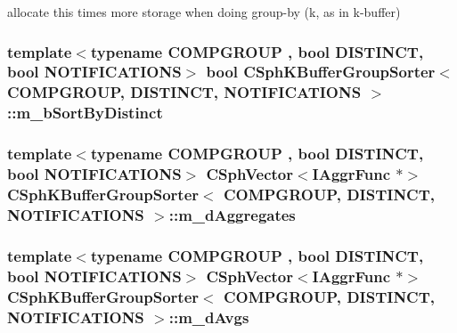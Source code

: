 allocate this times more storage when doing group-\/by (k, as in k-\/buffer) 

\hypertarget{classCSphKBufferGroupSorter_a27567c54ff3ffd4c83daebf4bb09470b}{
\subsubsection[{m\-\_\-b\-Sort\-By\-Distinct}]{\setlength{\rightskip}{0pt plus 5cm}template$<$typename C\-O\-M\-P\-G\-R\-O\-U\-P , bool D\-I\-S\-T\-I\-N\-C\-T, bool N\-O\-T\-I\-F\-I\-C\-A\-T\-I\-O\-N\-S$>$ bool {\bf C\-Sph\-K\-Buffer\-Group\-Sorter}$<$ C\-O\-M\-P\-G\-R\-O\-U\-P, D\-I\-S\-T\-I\-N\-C\-T, N\-O\-T\-I\-F\-I\-C\-A\-T\-I\-O\-N\-S $>$\-::m\-\_\-b\-Sort\-By\-Distinct\hspace{0.3cm}{\ttfamily [protected]}}}\label{classCSphKBufferGroupSorter_a27567c54ff3ffd4c83daebf4bb09470b}
\hypertarget{classCSphKBufferGroupSorter_ad0892c9b2b931104399b2c0136016fa8}{
\subsubsection[{m\-\_\-d\-Aggregates}]{\setlength{\rightskip}{0pt plus 5cm}template$<$typename C\-O\-M\-P\-G\-R\-O\-U\-P , bool D\-I\-S\-T\-I\-N\-C\-T, bool N\-O\-T\-I\-F\-I\-C\-A\-T\-I\-O\-N\-S$>$ {\bf C\-Sph\-Vector}$<${\bf I\-Aggr\-Func} $\ast$$>$ {\bf C\-Sph\-K\-Buffer\-Group\-Sorter}$<$ C\-O\-M\-P\-G\-R\-O\-U\-P, D\-I\-S\-T\-I\-N\-C\-T, N\-O\-T\-I\-F\-I\-C\-A\-T\-I\-O\-N\-S $>$\-::m\-\_\-d\-Aggregates\hspace{0.3cm}{\ttfamily [protected]}}}\label{classCSphKBufferGroupSorter_ad0892c9b2b931104399b2c0136016fa8}
\hypertarget{classCSphKBufferGroupSorter_a504d233b137a4e6dd84a6ff564927e60}{
\subsubsection[{m\-\_\-d\-Avgs}]{\setlength{\rightskip}{0pt plus 5cm}template$<$typename C\-O\-M\-P\-G\-R\-O\-U\-P , bool D\-I\-S\-T\-I\-N\-C\-T, bool N\-O\-T\-I\-F\-I\-C\-A\-T\-I\-O\-N\-S$>$ {\bf C\-Sph\-Vector}$<${\bf I\-Aggr\-Func} $\ast$$>$ {\bf C\-Sph\-K\-Buffer\-Group\-Sorter}$<$ C\-O\-M\-P\-G\-R\-O\-U\-P, D\-I\-S\-T\-I\-N\-C\-T, N\-O\-T\-I\-F\-I\-C\-A\-T\-I\-O\-N\-S $>$\-::m\-\_\-d\-Avgs\hspace{0.3cm}{\ttfamily [protected]}}}\label{classCSphKBufferGroupSorter_a504d233b137a4e6dd84a6ff564927e60}
